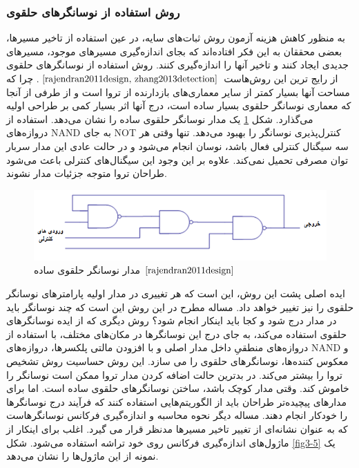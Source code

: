 \subsubsection {روش استفاده از نوسانگرهای حلقوی}
به منظور کاهش هزینه آزمون روش ثبات‌های سایه، در عین استفاده از تاخیر مسیرها، بعضی محققان به این فکر افتاده‌اند که بجای اندازه‌گیری مسیرهای موجود، مسیرهای جدیدی ایجاد کنند و تاخیر آنها را اندازه‌گیری کنند. روش استفاده از نوسانگرهای حلقوی از رایج ترین این روش‌هاست
$\cite{rajendran2011design, zhang2013detection}$. 
چرا که مساحت آنها بسیار کمتر از سایر معماری‌های بازدارنده از تروا است و از طرفی از آنجا که معماری نوسانگر حلقوی بسیار ساده است، درج آنها اثر بسیار کمی بر طراحی اولیه می‌گذارد.
شکل \ref{fig2-5} یک مدار نوسانگر حلقوی ساده را نشان می‌دهد. استفاده از دروازه‌های NAND به جای NOT کنترل‌پذیری نوسانگر را بهبود می‌دهد. تنها وقتی هر سه سیگنال کنترلی فعال باشد، نوسان انجام می‌شود و در حالت عادی این مدار سربار توان مصرفی تحمیل نمی‌کند. علاوه بر این وجود این سیگنال‌های کنترلی باعث می‌شود طراحان تروا متوجه جزئیات مدار نشوند.
\begin{figure}
	\begin{center}
		\includegraphics[scale=1]{figs/fig2-5.png}
		\caption[مدار نوسانگر حلقوی ساده]{مدار نوسانگر حلقوی ساده
			$\cite{rajendran2011design}$}
		\label{fig2-5}
	\end{center}
\end{figure} 
ایده اصلی پشت این روش، این است که هر تغییری در مدار اولیه پارامترهای نوسانگر حلقوی را نیز تغییر خواهد داد. مساله مطرح در این روش این است که چند نوسانگر باید در مدار درج شود و کجا باید اینکار انجام شود؟
روش دیگری که از ایده نوسانگرهای حلقوی استفاده می‌کند، به جای درج این نوسانگرها در مکان‌های مختلف، با استفاده از دروازه‌های منطقیِ داخل مدار اصلی و با افزودن مالتی پلکسرها، دروازه‌های NAND و معکوس کننده‌ها‌‌، نوسانگرهای حلقوی را می سازد. این روش حساسیت روش تشخیص تروا را بیشتر می‌کند. در بدترین حالت اضافه کردن مدار تروا ممکن است نوسانگر را خاموش کند.
وقتی مدار کوچک باشد، ساختن نوسانگرهای حلقوی ساده است. اما برای مدارهای پیچیده‌تر طراحان باید از الگوریتم‌هایی استفاده کنند که فرآیند درج نوسانگرها را خودکار انجام دهند. مساله دیگر نحوه محاسبه و اندازه‌گیری فرکانس نوسانگرهاست که به عنوان نشانه‌ای از تغییر تاخیر مسیرها مدنظر قرار می گیرد. اغلب برای اینکار از ماژول‌های اندازه‌گیری فرکانس روی خود تراشه استفاده می‌شود. شکل \ref{fig3-5} یک نمونه از این ماژول‌ها را نشان می‌دهد.
